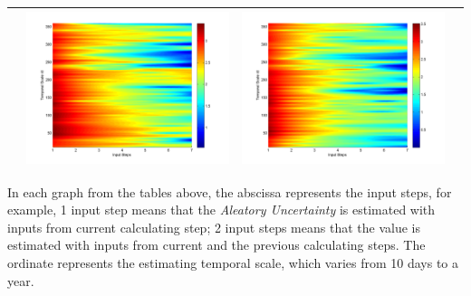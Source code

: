 \documentclass[11pt]{article}
\begin{document}
\begin{table}[H]
{\begin{tabular}{cccc}
&\begin{minipage}{.3\textwidth}\includegraphics[width=\linewidth]{resultgraph/AU/06810000pep_rela.png}\end{minipage}
&\begin{minipage}{.3\textwidth}\includegraphics[width=\linewidth]{resultgraph/AU/06810000pepq_rela.png}\end{minipage}
\\
\bottomrule
\end{tabular}
}
\end{table}

In each graph from the tables above, the abscissa represents the input steps, for example, 1 input step  means that the \emph{Aleatory Uncertainty} is estimated with inputs from current calculating step; 2 input steps means that  the value is estimated with inputs from current and the previous calculating steps. The ordinate represents the estimating temporal scale, which varies from 10 days to a year. 
\end{document}
